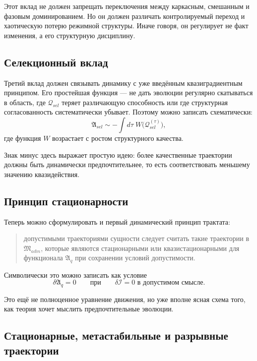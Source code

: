 \documentclass[12pt,a4paper]{article}
\begin{document}
Этот вклад не должен запрещать переключения между каркасным, смешанным и фазовым доминированием. Но он должен различать контролируемый переход и хаотическую потерю режимной структуры. Иначе говоря, он регулирует не факт изменения, а его структурную дисциплину.

\subsection{Селекционный вклад}

Третий вклад должен связывать динамику с уже введённым квазиградиентным принципом. Его простейшая функция --- не дать эволюции регулярно скатываться в область, где \(\mathcal{Q}_{sel}\) теряет различающую способность или где структурная согласованность систематически убывает. Поэтому можно записать схематически:
\begin{equation}
\mathfrak{A}_{sel}\sim -\int d\tau\; W\bigl(\mathcal{Q}_{sel}^{(\tau)}\bigr),
\end{equation}
где функция \(W\) возрастает с ростом структурного качества.

Знак минус здесь выражает простую идею: более качественные траектории должны быть динамически предпочтительнее, то есть соответствовать меньшему значению квазидействия.

\subsection{Принцип стационарности}

Теперь можно сформулировать и первый динамический принцип трактата:
\begin{quote}
допустимыми траекториями сущности следует считать такие траектории в \(\mathfrak{M}_{adm}\), которые являются стационарными или квазистационарными для функционала \(\mathfrak{A}_{q}\) при сохранении условий допустимости.
\end{quote}

Символически это можно записать как условие
\begin{equation}
\delta \mathfrak{A}_{q}=0
\qquad
\text{при}
\qquad
\delta \mathcal{I}=0 \text{ в допустимом смысле.}
\end{equation}

Это ещё не полноценное уравнение движения, но уже вполне ясная схема того, как теория хочет мыслить предпочтительные эволюции.

\subsection{Стационарные, метастабильные и разрывные траектории}
\end{document}
